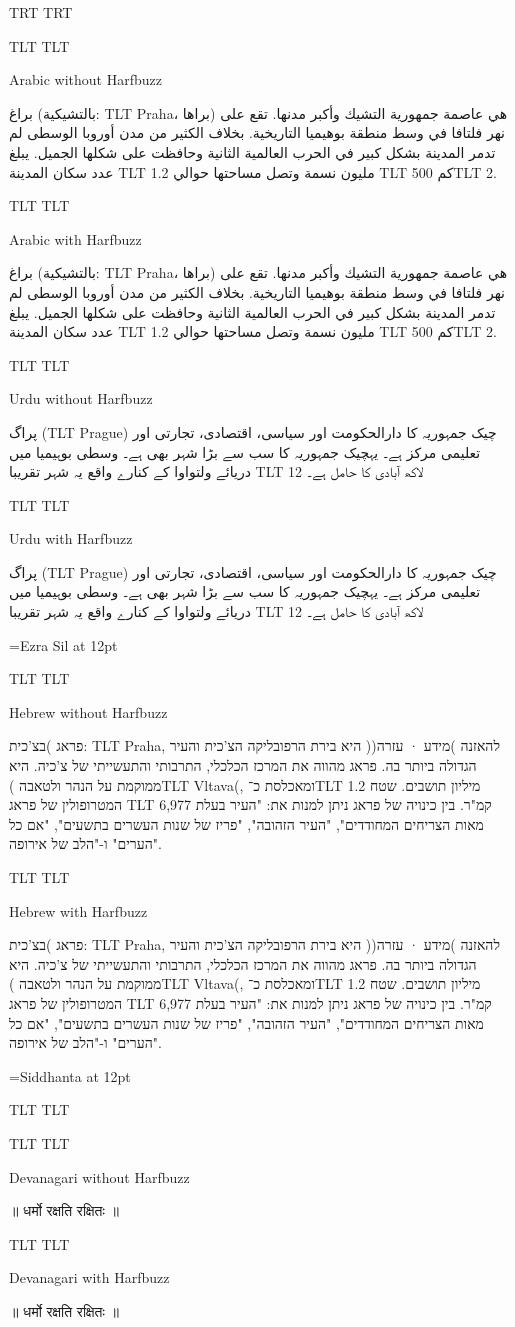 \documentclass{article}
\newcommand\sampletext[2]{%
\stopharfbuzz%
{\luatextextdir TLT%
  \luatexpardir TLT%
  \par\noindent#1 without Harfbuzz}\par
#2\par
\startharfbuzz%
{\luatextextdir TLT%
  \luatexpardir TLT%
  \par\noindent#1 with Harfbuzz}\par
#2\par%
}
\newcommand\textlatin[1]{\bgroup\luatextextdir TLT #1\egroup}
\begin{document}
\arab 
\startharfbuzz

\luatextextdir TRT
\luatexpardir TRT

\sampletext{Arabic}{براغ (بالتشيكية: \textlatin{Praha}، براها) هي عاصمة جمهورية التشيك وأكبر مدنها. تقع على نهر فلتافا في وسط منطقة بوهيميا التاريخية. بخلاف الكثير من مدن أوروبا الوسطى لم تدمر المدينة بشكل كبير في الحرب العالمية الثانية وحافظت على شكلها الجميل. يبلغ عدد سكان المدينة \textlatin{1.2} مليون نسمة وتصل مساحتها حوالي \textlatin{500} كم\textlatin{2.}}


\sampletext{Urdu}{پراگ (\textlatin{Prague}) چیک جمہوریہ کا دارالحکومت اور سیاسی، اقتصادی، تجارتی اور تعلیمی مرکز ہے۔ یہچیک جمہوریہ کا سب سے بڑا شہر بھی ہے۔ وسطی بوہیمیا میں دریائے ولتواوا کے کنارے واقع یہ شہر تقریبا \textlatin{12} لاکھ آبادی کا حامل ہے۔}

\font\ezra={Ezra Sil} at 12pt
\ezra
{}

\sampletext{Hebrew}{פראג )בצ'כית: \textlatin{Praha,} להאזנה )מידע · עזרה(( היא
  בירת הרפובליקה הצ'כית והעיר הגדולה ביותר בה. פראג מהווה את המרכז הכלכלי,
  התרבותי והתעשייתי של צ'כיה. היא ממוקמת על הנהר ולטאבה )\textlatin{Vltava}(,
  ומאכלסת כ־\textlatin{1.2} מיליון תושבים. שטח המטרופולין של פראג
  \textlatin{6,977} קמ"ר. בין כינויה של פראג ניתן למנות את: "העיר בעלת מאות
  הצריחים המחודדים", "העיר הזהובה", "פריז של שנות העשרים בתשעים", "אם כל הערים"
  ו-"הלב של אירופה".}

\font\siddhanta={Siddhanta} at 12pt
\bigskip

\siddhanta 

\luatextextdir TLT
\luatexpardir TLT

\sampletext{Devanagari}{%
॥ धर्मो रक्षति रक्षितः ॥
}
\end{document}
